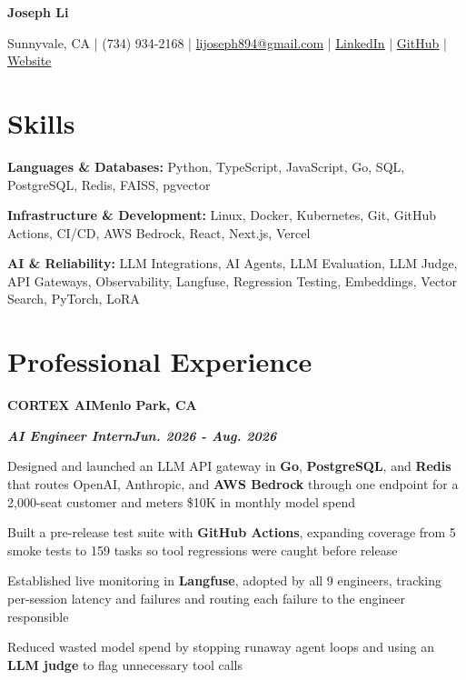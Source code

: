 \documentclass[10pt]{article}
\renewcommand{\resumeheader}[2]{%
  {\centering\fontsize{16}{18}\selectfont\bfseries #1\par}%
  \vspace{4pt}%
  {\centering\fontsize{10.5}{13}\selectfont #2\par}%
  \vspace{6pt}%
}
\renewcommand{\skill}[2]{\textbf{#1:} #2\par\vspace{1.5pt}}
\newcommand{\job}[4]{%
  \vspace{0pt}%
  \textbf{\MakeUppercase{#1}}\hfill\textbf{#2}\par
  \vspace{0.5pt}%
  \textbf{\textit{#3}}\hfill\textbf{\textit{#4}}\par
}
\begin{document}
\resumeheader{Joseph Li}{%
Sunnyvale, CA | (734) 934-2168 | \href{mailto:lijoseph894@gmail.com}{lijoseph894@gmail.com} | \href{https://www.linkedin.com/in/lijoseph894/}{\underline{LinkedIn}} | \href{https://github.com/josephl894}{\underline{GitHub}} | \href{https://josephl894.github.io}{\underline{Website}}}

\section{Skills}
\skill{Languages \& Databases}{Python, TypeScript, JavaScript, Go, SQL, PostgreSQL, Redis, FAISS, pgvector}
\skill{Infrastructure \& Development}{Linux, Docker, Kubernetes, Git, GitHub Actions, CI/CD, AWS Bedrock, React, Next.js, Vercel}
\skill{AI \& Reliability}{LLM Integrations, AI Agents, LLM Evaluation, LLM Judge, API Gateways, Observability, Langfuse, Regression Testing, Embeddings, Vector Search, PyTorch, LoRA}

\section{Professional Experience}
\job{Cortex AI}{Menlo Park, CA}{AI Engineer Intern}{Jun. 2026 - Aug. 2026}
\begin{bullets}
  \item Designed and launched an LLM API gateway in \textbf{Go}, \textbf{PostgreSQL}, and \textbf{Redis} that routes OpenAI, Anthropic, and \textbf{AWS Bedrock} through one endpoint for a 2,000-seat customer and meters \$10K in monthly model spend
  \item Built a pre-release test suite with \textbf{GitHub Actions}, expanding coverage from 5 smoke tests to 159 tasks so tool regressions were caught before release
  \item Established live monitoring in \textbf{Langfuse}, adopted by all 9 engineers, tracking per-session latency and failures and routing each failure to the engineer responsible
  \item Reduced wasted model spend by stopping runaway agent loops and using an \textbf{LLM judge} to flag unnecessary tool calls
\end{bullets}
\end{document}
